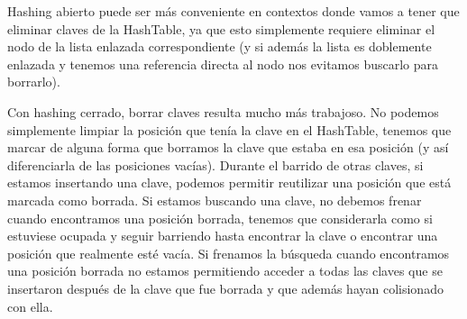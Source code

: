 Hashing abierto puede ser más conveniente en contextos donde vamos a tener que eliminar claves de la HashTable, ya que esto simplemente requiere eliminar el nodo de la lista enlazada correspondiente (y si además la lista es doblemente enlazada y tenemos una referencia directa al nodo nos evitamos buscarlo para borrarlo).

Con hashing cerrado, borrar claves resulta mucho más trabajoso. No podemos simplemente limpiar la posición que tenía la clave en el HashTable, tenemos que marcar de alguna forma que borramos la clave que estaba en esa posición (y así diferenciarla de las posiciones vacías). Durante el barrido de otras claves, si estamos insertando una clave, podemos permitir reutilizar una posición que está marcada como borrada. Si estamos buscando una clave, no debemos frenar cuando encontramos una posición borrada, tenemos que considerarla como si estuviese ocupada y seguir barriendo hasta encontrar la clave o encontrar una posición que realmente esté vacía. Si frenamos la búsqueda cuando encontramos una posición borrada no estamos permitiendo acceder a todas las claves que se insertaron después de la clave que fue borrada y que además hayan colisionado con ella.
